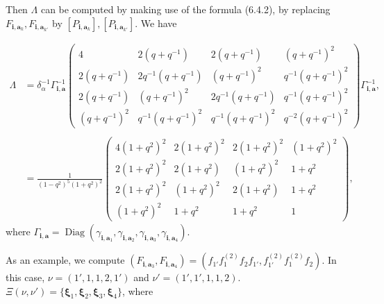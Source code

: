 \documentclass[12pt]{amsart}
\renewcommand\a{\alpha}
\newcommand\g{\gamma}
\renewcommand\d{\delta}
\newcommand\vL{\varLambda}
\newcommand\vG{\varGamma}
\renewcommand{\1}{\mathbb 1}
\newcommand\Bi{\mathbf i}
\newcommand\Ba{\mathbf a}
\newcommand\Bxi{\boldsymbol\xi}
\newcommand\iv{^{-1}}
\newcommand\Diag{\operatorname{Diag}}
\numberwithin{equation}{section}
\begin{document}
Then $\vL$ can be computed by making use of the formula (6.4.2), 
by replacing $F_{\Bi, \Ba_k}, F_{\Bi, \Ba_{k'}}$ by
$[P_{\Bi, \Ba_k}], [P_{\Bi,\Ba_{k'}}]$.  We have

{\footnotesize 
\begin{align*}
\tag{7.2.1}  
\vL &= \d_{\a}\iv \vG_{\Bi,\Ba}\iv
            \begin{pmatrix}    
               4  &   2(q+q\iv)  &  2(q+q\iv)  &   (q + q\iv)^2   \\ 
               2(q+q\iv)    &   2q\iv (q + q\iv)  &  (q+q\iv)^2  &  q\iv (q + q\iv)^2  \\
               2(q+q\iv)    &   (q + q\iv)^2   &   2q\iv(q + q\iv)  &   q\iv (q + q\iv)^2  \\
               (q + q\iv)^2  &  q\iv(q + q\iv)^2  &  q\iv(q + q\iv)^2  &  q^{-2}(q + q\iv)^2
             \end{pmatrix}\vG_{\Bi, \Ba}\iv,  \\   \\
    &=   \frac{1}{(1-q^2)^5(1+q^2)^2}
          \begin{pmatrix}
            4(1+q^2)^2   &  2(1+q^2)^2  &   2(1+q^2)^2   &  (1 + q^2)^2  \\
            2(1+q^2)^2   &  2(1+q^2)  &  (1 + q^2)^2   &   1 + q^2  \\
            2(1+q^2)^2   &  (1 + q^2)^2    &  2(1+q^2)  &   1+q^2   \\
           (1+q^2)^2    &  1 + q^2   &  1 + q^2    &   1
          \end{pmatrix}, 
\end{align*}
}
where $\vG_{\Bi,\Ba} = \Diag(\g_{\Bi, \Ba_1}, \g_{\Bi,\Ba_2}, \g_{\Bi,\Ba_3}, \g_{\Bi, \Ba_4})$.  
\par\medskip
As an example, we compute
$(F_{\Bi,\Ba_3}, F_{\Bi, \Ba_4}) =
     (f_{1'}f_1^{(2)}f_2f_{1'}, f_{1'}^{(2)}f_1^{(2)}f_2)$.
In this case, $\nu = (1',1,1,2,1')$ and $\nu' = (1',1',1,1,2)$.
$\Xi(\nu,\nu') = \{ \Bxi_1, \Bxi_2, \Bxi_3, \Bxi_4\}$, where
\end{document}
